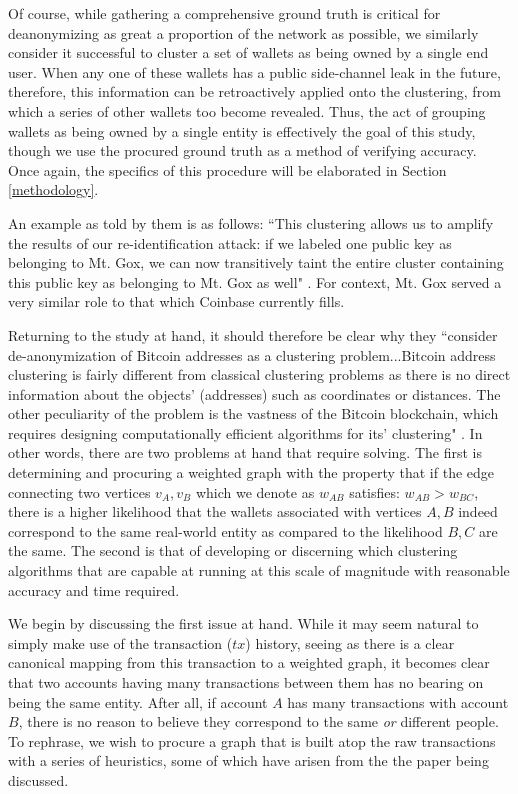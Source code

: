 \documentclass[journal]{IEEEtran}
\begin{document}
Of course, while gathering a comprehensive ground truth is critical for deanonymizing as great a proportion of the network as possible, we similarly consider it successful to cluster a set of wallets as being owned by a single end user. When any one of these wallets has a public side-channel leak in the future, therefore, this information can be retroactively applied onto the clustering, from which a series of other wallets too become revealed. Thus, the act of grouping wallets as being owned by a single entity is effectively the goal of this study, though we use the procured ground truth as a method of verifying accuracy. Once again, the specifics of this procedure will be elaborated in Section \ref{methodology}.

An example as told by them is as follows: ``This clustering allows us to amplify the results of our re-identification attack: if we labeled one public key as belonging to Mt. Gox, we can now transitively taint the entire cluster containing this public key as belonging to Mt. Gox as well" \cite{fistful}. For context, Mt. Gox served a very similar role to that which Coinbase currently fills. 

Returning to the study at hand, it should therefore be clear why they ``consider de-anonymization of Bitcoin addresses as a clustering problem...Bitcoin address clustering is fairly different from classical clustering problems as there is no direct information about the objects' (addresses) such as coordinates or distances. The other peculiarity of the problem is the vastness of the Bitcoin blockchain, which requires designing computationally efficient algorithms for its' clustering" \cite{automatic}. In other words, there are two problems at hand that require solving. The first is determining and procuring a weighted graph with the property that if the edge connecting two vertices $v_{A},v_{B}$ which we denote as $w_{AB}$ satisfies: $w_{AB} > w_{BC}$, there is a higher likelihood that the wallets associated with vertices $A,B$ indeed correspond to the same real-world entity as compared to the likelihood $B,C$ are the same. The second is that of developing or discerning which clustering algorithms that are capable at running at this scale of magnitude with reasonable accuracy and time required.

We begin by discussing the first issue at hand. While it may seem natural to simply make use of the transaction ($tx$) history, seeing as there is a clear canonical mapping from this transaction to a weighted graph, it becomes clear that two accounts having many transactions between them has no bearing on being the same entity. After all, if account $A$ has many transactions with account $B$, there is no reason to believe they correspond to the same \textit{or} different people. To rephrase, we wish to procure a graph that is built atop the raw transactions with a series of heuristics, some of which have arisen from the the paper being discussed.
\end{document}
